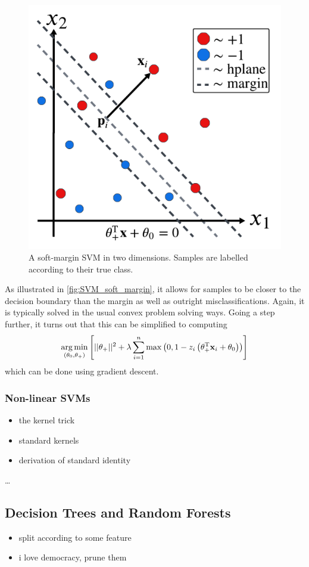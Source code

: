 \documentclass[11pt]{article}
\begin{document}
\begin{figure}[ht]
    \centering
    \includegraphics[width=0.5\columnwidth]{./figures/SVMs/SVM_soft_margin.pdf}
    \caption{\centering A soft-margin SVM in two dimensions. Samples are labelled according to their true class.}
    \label{fig:SVM_soft_margin}
\end{figure}

\noindent As illustrated in \autoref{fig:SVM_soft_margin}, it allows for samples to be closer to the decision boundary than the margin as well as outright misclassifications. Again, it is typically solved in the usual convex problem solving ways. Going a step further, it turns out that this can be simplified to computing
$$
\operatorname*{arg\,min}_{(\theta_0,\theta_+)}\left[||\theta_+||^2+\lambda\sum_{i=1}^n\max\left(0,1-z_i\left(\theta_+^{\text{T}}\mathbf{x}_i+\theta_0\right)\right)\right]
$$
which can be done using gradient descent.

\subsubsection{Non-linear SVMs}
\begin{itemize}
    \item the kernel trick
    \item standard kernels
    \item derivation of standard identity
\end{itemize}
\dots

\subsection{Decision Trees and Random Forests}
\begin{itemize}
    \item split according to some feature
    \item i love democracy, prune them
\end{itemize}
\end{document}
